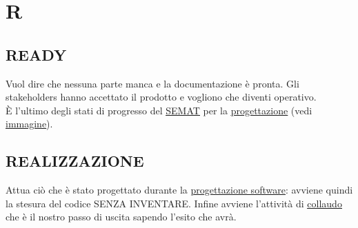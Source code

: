 \newpage
	\section{R} \label{sec:R}

		\subsection{READY}		\label{ready}
		Vuol dire che nessuna parte manca e la documentazione è pronta. Gli stakeholders hanno accettato il prodotto e vogliono che diventi operativo. \\
		È l'ultimo degli stati di progresso del \underline{\hyperref[semat]{SEMAT}} per la \underline{\hyperref[progettazione]{progettazione}} (vedi \underline{\hyperref[solutionimage]{immagine}}).

		\subsection{REALIZZAZIONE} 	\label{realizzazione}
		Attua ciò che è stato progettato durante la \underline{\hyperref[progettazione]{progettazione software}}: avviene quindi la stesura del codice SENZA INVENTARE. Infine avviene l'attività di \underline{\hyperref[collaudo]{collaudo}} che è il nostro passo di uscita sapendo l'esito che avrà.

